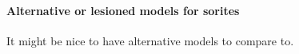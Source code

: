 \documentclass{article}
\begin{document}
\begin{appendices}
      \paragraph{Alternative or lesioned models for sorites}

      It might be nice to have alternative models to compare to.





\end{appendices}
\end{document}
